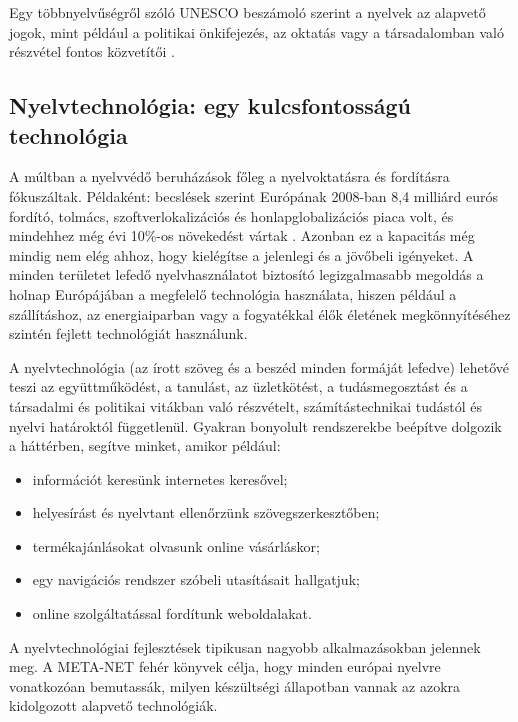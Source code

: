 \begin{multicols}{2}

  Egy többnyelvűségről szóló UNESCO beszámoló szerint a nyelvek az alapvető jogok, mint például a politikai önkifejezés, az oktatás vagy a társadalomban való részvétel fontos közvetítői \cite{Unesco1}.

  \subsection{Nyelvtechnológia: egy kulcsfontosságú technológia}

  A múltban a nyelvvédő beruházások főleg a nyelvoktatásra és fordításra fókuszáltak. Példaként: becslések szerint Európának 2008-ban 8,4 milliárd eurós fordító, tolmács, szoftverlokalizációs és honlapglobalizációs piaca volt, és mindehhez még évi 10\%-os növekedést vártak \cite{EC3}. Azonban ez a kapacitás még mindig nem elég ahhoz, hogy kielégítse a jelenlegi és a jövőbeli igényeket. A minden területet lefedő nyelvhasználatot biztosító legizgalmasabb megoldás a holnap Európájában a megfelelő technológia használata, hiszen például a szállításhoz, az energiaiparban vagy a fogyatékkal élők életének megkönnyítéséhez szintén fejlett technológiát használunk.

  A nyelvtechnológia (az írott szöveg és a beszéd minden formáját lefedve) lehetővé teszi az együttműködést, a tanulást, az üzletkötést, a tudásmegosztást és a társadalmi és politikai vitákban való rész\-vé\-telt, számítástechnikai tudástól és nyelvi határoktól függetlenül. Gyakran bo\-nyo\-lult rendszerekbe beépítve dolgozik a háttérben, segítve minket, amikor például:

  \begin{itemize}
  \item információt keresünk internetes ke\-re\-ső\-vel;
  \item helyesírást és nyelvtant ellenőrzünk szövegszerkesztőben;
  \item termékajánlásokat olvasunk online vásárláskor;
  \item egy navigációs rendszer szóbeli uta\-sí\-tá\-sait hallgatjuk;
  \item online szolgáltatással fordítunk web\-oldalakat.
  \end{itemize}

  A nyelvtechnológiai fejlesztések tipikusan nagyobb alkalmazásokban jelennek meg. A META-NET fehér könyvek célja, hogy minden európai nyelvre vonatkozóan bemutassák, milyen készültségi állapotban vannak az azokra kidolgozott alapvető technológiák.


\end{multicols}
